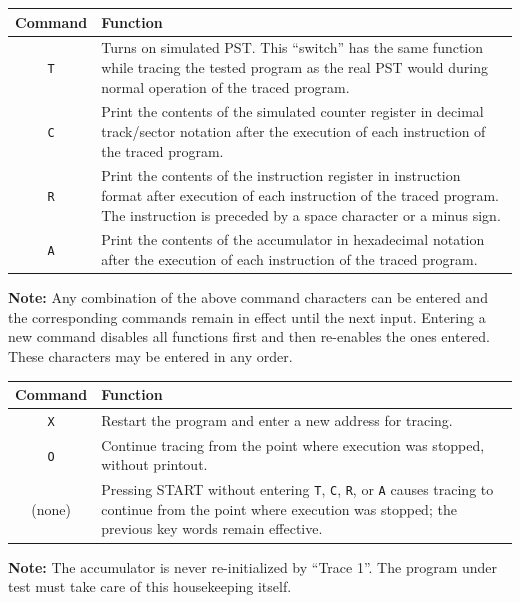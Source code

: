 \begin{table}[h!]
\centering
\begin{tabularx}{\textwidth}{cX}
\toprule
\textbf{Command} & \textbf{Function} \\
\midrule
\texttt{T} & Turns on simulated \textsf{PST}. This ``switch'' has the same function while tracing the tested program as the real PST would during normal operation of the traced program. \\
\midrule
\texttt{C} & Print the contents of the simulated counter register in decimal track/sector notation after the execution of each instruction of the traced program. \\
\midrule
\texttt{R} & Print the contents of the instruction register in instruction format after execution of each instruction of the traced program. The instruction is preceded by a space character or a minus sign. \\
\midrule
\texttt{A} & Print the contents of the accumulator in hexadecimal notation after the execution of each instruction of the traced program. \\
\bottomrule
\end{tabularx}
\end{table}

\noindent \textbf{Note:} Any combination of the above command characters can be entered and the corresponding commands remain in effect until the next input. Entering a new command disables all functions first and then re-enables the ones entered. These characters may be entered in any order.

\begin{table}[h!]
\centering
\begin{tabularx}{\textwidth}{cX}
\toprule
\textbf{Command} & \textbf{Function} \\
\midrule
\texttt{X} & Restart the program and enter a new address for tracing. \\
\midrule
\texttt{O} & Continue tracing from the point where execution was stopped, without printout. \\
\midrule
(none)     & Pressing \textsf{START} without entering \texttt{T}, \texttt{C}, \texttt{R}, or \texttt{A} causes tracing to continue from the point where execution was stopped; the previous key words remain effective. \\
\bottomrule
\end{tabularx}
\end{table}

\noindent \textbf{Note:} The accumulator is never re-initialized by ``Trace 1''. The program under test must take care of this housekeeping itself.

